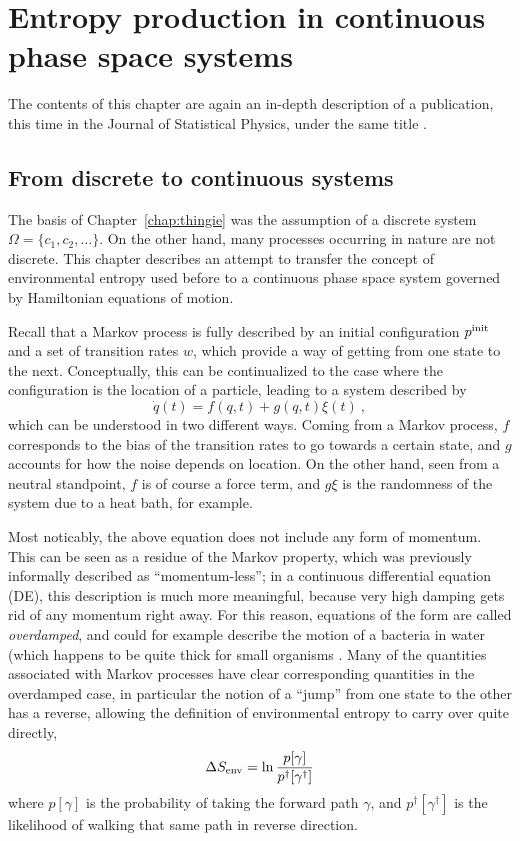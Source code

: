 \chapter{Entropy production in continuous phase space systems}
\label{chap:flow}

The contents of this chapter are again an in-depth description of a publication, this time in the Journal of Statistical Physics, under the same title \cite{flow-paper}.



\section{From discrete to continuous systems}

The basis of Chapter~\ref{chap:thingie} was the assumption of a discrete system \(\Omega = \{c_1, c_2, \ldots\}\). On the other hand, many processes occurring in nature are not discrete. This chapter describes an attempt to transfer the concept of environmental entropy used before to a continuous phase space system governed by Hamiltonian equations of motion.

Recall that a Markov process is fully described by an initial configuration \(p^{\text{init}}\) and a set of transition rates \(w\), which provide a way of getting from one state to the next. Conceptually, this can be continualized to the case where the configuration is the location of a particle, leading to a system described by
%
\begin{equation}
	\label{eqn:overdamped}
	\dot q(t) = f(q,t) + g(q,t)\xi(t) ~,
\end{equation}
%
which can be understood in two different ways. Coming from a Markov process, \(f\) corresponds to the bias of the transition rates to go towards a certain state, and \(g\) accounts for how the noise depends on location. On the other hand, seen from a neutral standpoint, \(f\) is of course a force term, and \(g\xi\) is the randomness of the system due to a heat bath, for example.

Most noticably, the above equation does not include any form of momentum. This can be seen as a residue of the Markov property, which was previously informally described as ``momentum-less''; in a continuous differential equation (DE), this description is much more meaningful, because very high damping gets rid of any momentum right away. For this reason, equations of the form  are called \emph{overdamped}, and could for example describe the motion of a bacteria in water (which happens to be quite thick for small organisms \cite{sengupta}. Many of the quantities associated with Markov processes have clear corresponding quantities in the overdamped case, in particular the notion of a ``jump'' from one state to the other has a reverse, allowing the definition of environmental entropy to carry over quite directly,
%
\begin{equation}
	\Delta S_\text{env} = \ln\frac{p[\gamma]}{p^\dagger[\gamma^\dagger]}
\end{equation}
%
where \(p[\gamma]\) is the probability of taking the forward path \(\gamma\), and \(p^\dagger[\gamma^\dagger]\) is the likelihood of walking that same path in reverse direction.


